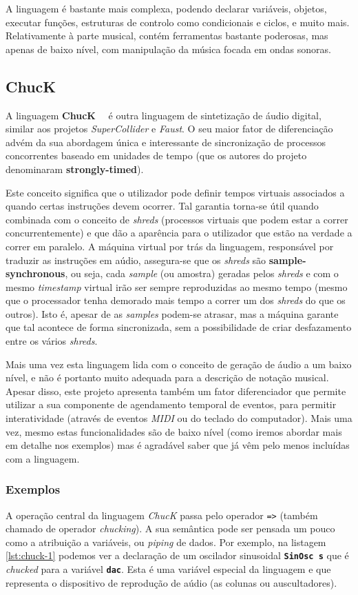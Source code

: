 A linguagem é bastante mais complexa, podendo declarar variáveis, objetos, executar funções, estruturas de controlo como condicionais e ciclos, e muito mais. Relativamente à parte musical, contém ferramentas bastante poderosas, mas apenas de baixo nível, com manipulação da música focada em ondas sonoras.

\subsection{ChucK}
A linguagem \textbf{ChucK}~\cite{doi:Chuck}~\cite{wang2003chuck} é outra linguagem de sintetização de áudio digital, similar aos projetos \textit{SuperCollider} e \textit{Faust}. O seu maior fator de diferenciação advém da sua abordagem única e interessante de sincronização de processos concorrentes baseado em unidades de tempo (que os autores do projeto denominaram \textbf{strongly-timed}).

Este conceito significa que o utilizador pode definir tempos virtuais associados a quando certas instruções devem ocorrer. Tal garantia torna-se útil quando combinada com o conceito de \textit{shreds} (processos virtuais que podem estar a correr concurrentemente) e que dão a aparência para o utilizador que estão na verdade a correr em paralelo. A máquina virtual por trás da linguagem, responsável por traduzir as instruções em aúdio, assegura-se que os \textit{shreds} são \textbf{sample-synchronous}, ou seja, cada \textit{sample} (ou amostra) geradas pelos \textit{shreds} e com o mesmo \textit{timestamp} virtual irão ser sempre reproduzidas ao mesmo tempo (mesmo que o processador tenha demorado mais tempo a correr um dos \textit{shreds} do que os outros). Isto é, apesar de as \textit{samples} podem-se atrasar, mas a máquina garante que tal acontece de forma sincronizada, sem a possibilidade de criar desfazamento entre os vários \textit{shreds}.

Mais uma vez esta linguagem lida com o conceito de geração de áudio a um baixo nível, e não é portanto muito adequada para a descrição de notação musical. Apesar disso, este projeto apresenta também um fator diferenciador que permite utilizar a sua componente de agendamento temporal de eventos, para permitir interatividade (através de eventos \textit{MIDI} ou do teclado do computador). Mais uma vez, mesmo estas funcionalidades são de baixo nível (como iremos abordar mais em detalhe nos exemplos) mas é agradável saber que já vêm pelo menos incluídas com a linguagem.

\subsubsection{Exemplos}
A operação central da linguagem \textit{ChucK} passa pelo operador \texttt{=>} (também chamado de operador \textit{chucking}). A sua semântica pode ser pensada um pouco como a atribuição a variáveis, ou \textit{piping} de dados. Por exemplo, na listagem \ref{lst:chuck-1} podemos ver a declaração de um oscilador sinusoidal \textbf{\texttt{SinOsc s}} que é \textit{chucked} para a variável \textbf{\texttt{dac}}. Esta é uma variável especial da linguagem e que representa o dispositivo de reprodução de aúdio (as colunas ou auscultadores).

